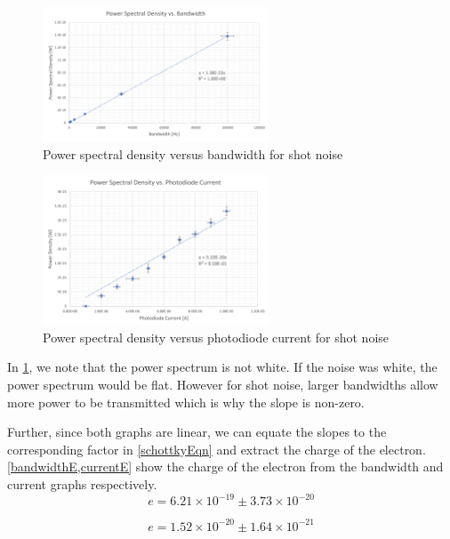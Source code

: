\documentclass[12pt]{article}
\begin{document}
	\begin{figure}[H]
		\centering
		\includegraphics[width=0.6\textwidth]{ShotBandwidth.PNG}
		\caption{Power spectral density versus bandwidth for shot noise}
		\label{shotBandwidth}
	\end{figure}
	
	\begin{figure}[H]
		\centering
		\includegraphics[width=0.6\textwidth]{ShotCurrent.PNG}
		\caption{Power spectral density versus photodiode current for shot noise}
		\label{shotCurrent}
	\end{figure}
	
	In \cref{shotBandwidth}, we note that the power spectrum is not white. If the noise was white, the power spectrum would be flat. However for shot noise,  larger bandwidths allow more power to be transmitted which is why the slope is non-zero.
	
	Further, since both graphs are linear, we can equate the slopes to the corresponding factor in \cref{schottkyEqn} and extract the charge of the electron. \cref{bandwidthE,currentE} show the charge of the electron from the bandwidth and current graphs respectively.
	\begin{equation}
		e = 6.21 \times 10^{-19} \pm 3.73 \times 10^{-20}
		\label{bandwidthE}
	\end{equation}

	\begin{equation}
		e= 1.52 \times 10^{-20} \pm 1.64 \times 10^{-21}
		\label{currentE}
	\end{equation}
	
\end{document}
